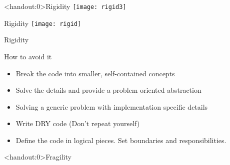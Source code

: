 \documentclass[xcolor=svgnames]{beamer}
\begin{document}
{%
%
\begin{frame}<handout:0>{Rigidity}
    \centering
    \texttt{[image: rigid3]}
\end{frame}
}

{%
%
\begin{frame}{Rigidity}
    \centering
    \texttt{[image: rigid]}
\end{frame}
}



{%
%
\begin{frame}{Rigidity}

    How to avoid it
    \begin{itemize}
        \item<1-> Break the code into smaller, self-contained concepts
        \item<2-> Solve the details and provide a problem oriented abstraction
        \item<3-> Solving a generic problem with implementation specific details
        \item<4-> Write DRY code (Don't repeat yourself)
        \item<5-> Define the code in logical pieces.  Set boundaries and
            responsibilities.
    \end{itemize}
\end{frame}
}


{%
%
\begin{frame}<handout:0>{Fragility}
\end{frame}
}
\end{document}

